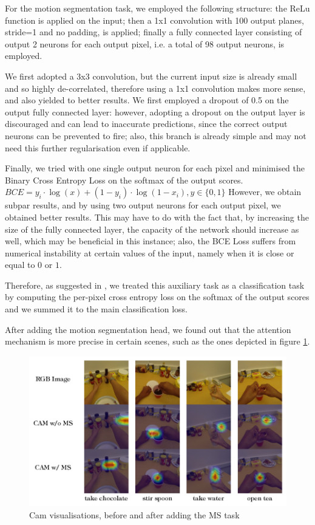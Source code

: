 \documentclass[10pt,twocolumn,letterpaper]{article}
\begin{document}
For the motion segmentation task, we employed the following structure: the ReLu function is applied on the input; then a 1x1 convolution with 100 output planes, stride=1 and no padding, is applied; finally a fully connected layer consisting of output 2 neurons for each output pixel, i.e. a total of 98 output neurons, is employed.

We first adopted a 3x3 convolution, but the current input size is already small and so highly de-correlated, therefore using a 1x1 convolution makes more sense, and also yielded to better results. We first employed a dropout of 0.5 on the output fully connected layer: however, adopting a dropout on the output layer is discouraged and can lead to inaccurate predictions, since the correct output neurons can be prevented to fire; also, this branch is already simple and may not need this further regularisation even if applicable. 

Finally, we tried with one single output neuron for each pixel and minimised the Binary Cross Entropy Loss on the softmax of the output scores. ${BCE = y_i \cdot \log(x) + (1 - y_i) \cdot \log(1 - x_i), y \in \{0, 1\}}$ However, we obtain subpar results, and by using two output neurons for each output pixel, we obtained better results. This may have to do with the fact that, by increasing the size of the fully connected layer, the capacity of the network should increase as well, which may be beneficial in this instance; also, the BCE Loss suffers from numerical instability at certain values of the input, namely when it is close or equal to $0$ or $1$.

Therefore, as suggested in \cite{planamente2020joint}, we treated this auxiliary task as a classification task by computing the per-pixel cross entropy loss on the softmax of the output scores and we summed it to the main classification loss.

After adding the motion segmentation head, we found out that the attention mechanism is more precise in certain scenes, such as the ones depicted in figure \ref{fig:cams}.

\begin{figure}
	\begin{center}
		\includegraphics[width=\linewidth]{grafici/cams_img.pdf}		
	\end{center}
	\caption{Cam visualisations, before and after adding the MS task}
	\label{fig:cams}
\end{figure}
\end{document}
